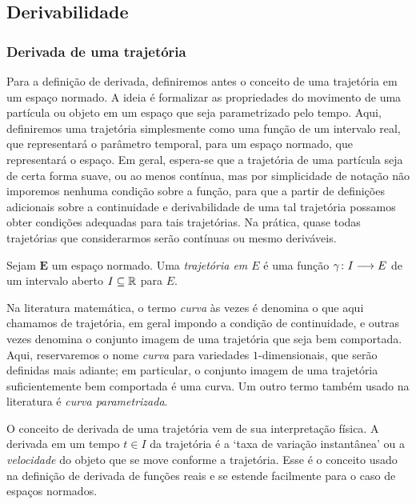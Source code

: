 \subsection{Derivabilidade}

\subsubsection{Derivada de uma trajetória}

Para a definição de derivada, definiremos antes o conceito de uma trajetória em um espaço normado. A ideia é formalizar as propriedades do movimento de uma partícula ou objeto em um espaço que seja parametrizado pelo tempo. Aqui, definiremos uma trajetória simplesmente como uma função de um intervalo real, que representará o parâmetro temporal, para um espaço normado, que representará o espaço. Em geral, espera-se que a trajetória de uma partícula seja de certa forma suave, ou ao menos contínua, mas por simplicidade de notação não imporemos nenhuma condição sobre a função, para que a partir de definições adicionais sobre a continuidade e derivabilidade de uma tal trajetória possamos obter condições adequadas para tais trajetórias. Na prática, quase todas trajetórias que considerarmos serão contínuas ou mesmo deriváveis.

\begin{definition}
Sejam $\bm E$ um espaço normado. Uma \emph{trajetória em $E$} é uma função ${\gamma}\colon {I} \longrightarrow {E}$ de um intervalo aberto $I \subseteq \mathbb{R}$ para $E$.
\end{definition}

Na literatura matemática, o termo \textit{curva} às vezes é denomina o que aqui chamamos de trajetória, em geral impondo a condição de continuidade, e outras vezes denomina o conjunto imagem de uma trajetória que seja bem comportada. Aqui, reservaremos o nome \textit{curva} para variedades $1$-dimensionais, que serão definidas mais adiante; em particular, o conjunto imagem de uma trajetória suficientemente bem comportada é uma curva. Um outro termo também usado na literatura é \textit{curva parametrizada}.

O conceito de derivada de uma trajetória vem de sua interpretação física. A derivada em um tempo $t \in I$ da trajetória é a `taxa de variação instantânea' ou a \emph{velocidade} do objeto que se move conforme a trajetória. Esse é o conceito usado na definição de derivada de funções reais e se estende facilmente para o caso de espaços normados.

